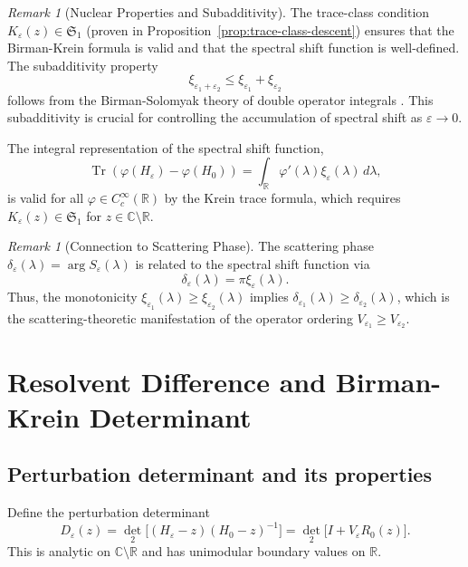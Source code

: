 ﻿\documentclass[12pt,a4paper]{article}
\theoremstyle{definition}
\theoremstyle{remark}
\newtheorem{remark}[theorem]{Remark}
\newcommand{\CC}{\mathbb{C}}
\newcommand{\RR}{\mathbb{R}}
\newcommand{\Tr}{\operatorname{Tr}}
\begin{document}
\begin{remark}[Nuclear Properties and Subadditivity]
\label{rem:nuclear-properties}
The trace-class condition $K_\varepsilon(z) \in \mathfrak{S}_1$ (proven in Proposition~\ref{prop:trace-class-descent}) ensures that the Birman-Krein formula is valid and that the spectral shift function is well-defined. The subadditivity property
\[
\xi_{\varepsilon_1 + \varepsilon_2} \leq \xi_{\varepsilon_1} + \xi_{\varepsilon_2}
\]
follows from the Birman-Solomyak theory of double operator integrals \cite{Birman1975}. This subadditivity is crucial for controlling the accumulation of spectral shift as $\varepsilon \to 0$.

The integral representation of the spectral shift function,
\[
\Tr(\varphi(H_\varepsilon) - \varphi(H_0)) = \int_\RR \varphi'(\lambda) \xi_\varepsilon(\lambda) \, d\lambda,
\]
is valid for all $\varphi \in C_c^\infty(\RR)$ by the Krein trace formula, which requires $K_\varepsilon(z) \in \mathfrak{S}_1$ for $z \in \CC \setminus \RR$.
\end{remark}

\begin{remark}[Connection to Scattering Phase]
\label{rem:scattering-phase}
The scattering phase $\delta_\varepsilon(\lambda) = \arg S_\varepsilon(\lambda)$ is related to the spectral shift function via
\[
\delta_\varepsilon(\lambda) = \pi \xi_\varepsilon(\lambda).
\]
Thus, the monotonicity $\xi_{\varepsilon_1}(\lambda) \geq \xi_{\varepsilon_2}(\lambda)$ implies $\delta_{\varepsilon_1}(\lambda) \geq \delta_{\varepsilon_2}(\lambda)$, which is the scattering-theoretic manifestation of the operator ordering $V_{\varepsilon_1} \geq V_{\varepsilon_2}$.
\end{remark}

\section{Resolvent Difference and Birman-Krein Determinant}

\subsection{Perturbation determinant and its properties}
Define the perturbation determinant
\begin{equation*}
D_\varepsilon(z) = \det_2\bigl[(H_\varepsilon - z)(H_0 - z)^{-1}\bigr] = \det_2\bigl[I + V_\varepsilon R_0(z)\bigr].
\end{equation*}
This is analytic on $\CC \setminus \RR$ and has unimodular boundary values on $\RR$.
\end{document}

